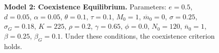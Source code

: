 \documentclass{amsart}
\theoremstyle{definition}
\theoremstyle{remark}
\numberwithin{equation}{section}
\begin{document}
\begin{centering}
\begin{figure}[h]
{		}
		\caption{\footnotesize {\bf Model 2: Coexistence Equilibrium.} Parameters: $e = 0.5$, $d = 0.05$, $\alpha = 0.05$, $\theta = 0.1$, $\tau = 0.1$, $M_0 = 1$, $\overline{m}_0 = 0$, $\sigma = 0.25$, $\sigma_G = 0.18$, $K = 225$, $\rho = 0.2$, $\gamma = 0.65$, $\phi = 0.0$, $N_0 = 120$, $\overline{n}_0 = 1$, $\beta = 0.25$, $\beta_G = 0.1$.  Under these conditions, the coexistence criterion holds.}
		\label{fig:variable_growth_coexistence_equilibrium}
	\end{figure}


\end{centering}
\end{document}
